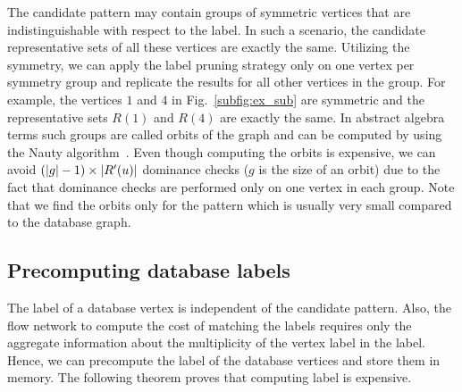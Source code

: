 \medskip{} The candidate pattern may contain
groups of symmetric vertices that are indistinguishable with respect to
the \khop label.  In such a scenario, the candidate representative sets
of all these vertices are exactly the same. Utilizing the symmetry, we
can apply the label pruning strategy only on one vertex per symmetry
group and replicate the results for all other vertices in the group. For
example, the vertices $1$ and $4$ in Fig.~\ref{subfig:ex_sub} are
symmetric and the representative sets $R(1)$ and $R(4)$ are exactly the
same.  In abstract algebra terms such  groups are called orbits of the
graph and can be computed by using the Nauty algorithm~\cite{nauty}.
Even though computing the orbits is expensive, we can avoid $ (|g|-1)
\times |R'(u)|$ \ncl dominance checks 
($g$ is the size of an
orbit) due to the fact that \ncl dominance checks are performed only on
one vertex in each group.
Note that we find the orbits only for the pattern which is
usually very small compared to the database graph.

\subsection{Precomputing database \khop labels} The \khop label of a
database vertex is independent of the candidate pattern.  Also, the flow
network to compute the cost of matching the \khop labels requires only
the aggregate information about the multiplicity of the vertex label in
the \khop label.  Hence, we can precompute the \khop label of the
database vertices and store them in memory. The following theorem
proves that computing \khop label is expensive.

